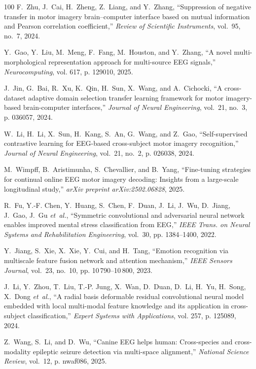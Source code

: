 \documentclass[journal]{IEEEtran}
\begin{document}
\begin{thebibliography}{100}
F.~Zhu, J.~Cai, H.~Zheng, Z.~Liang, and Y.~Zhang, ``Suppression of negative
  transfer in motor imagery brain--computer interface based on mutual
  information and {Pearson} correlation coefficient,'' \emph{Review of
  Scientific Instruments}, vol.~95, no.~7, 2024.

Y.~Gao, Y.~Liu, M.~Meng, F.~Fang, M.~Houston, and Y.~Zhang, ``A novel
  multi-morphological representation approach for multi-source {EEG} signals,''
  \emph{Neurocomputing}, vol. 617, p. 129010, 2025.

J.~Jin, G.~Bai, R.~Xu, K.~Qin, H.~Sun, X.~Wang, and A.~Cichocki, ``A
  cross-dataset adaptive domain selection transfer learning framework for motor
  imagery-based brain-computer interfaces,'' \emph{Journal of Neural
  Engineering}, vol.~21, no.~3, p. 036057, 2024.

W.~Li, H.~Li, X.~Sun, H.~Kang, S.~An, G.~Wang, and Z.~Gao, ``Self-supervised
  contrastive learning for {EEG}-based cross-subject motor imagery
  recognition,'' \emph{Journal of Neural Engineering}, vol.~21, no.~2, p.
  026038, 2024.

M.~Wimpff, B.~Aristimunha, S.~Chevallier, and B.~Yang, ``Fine-tuning strategies
  for continual online {EEG} motor imagery decoding: Insights from a
  large-scale longitudinal study,'' \emph{arXiv preprint arXiv:2502.06828},
  2025.

R.~Fu, Y.-F. Chen, Y.~Huang, S.~Chen, F.~Duan, J.~Li, J.~Wu, D.~Jiang, J.~Gao,
  J.~Gu \emph{et~al.}, ``Symmetric convolutional and adversarial neural network
  enables improved mental stress classification from {EEG},'' \emph{IEEE Trans.
  on Neural Systems and Rehabilitation Engineering}, vol.~30, pp. 1384--1400,
  2022.

Y.~Jiang, S.~Xie, X.~Xie, Y.~Cui, and H.~Tang, ``Emotion recognition via
  multiscale feature fusion network and attention mechanism,'' \emph{IEEE
  Sensors Journal}, vol.~23, no.~10, pp. 10\,790--10\,800, 2023.

J.~Li, Y.~Zhou, T.~Liu, T.-P. Jung, X.~Wan, D.~Duan, D.~Li, H.~Yu, H.~Song,
  X.~Dong \emph{et~al.}, ``A radial basis deformable residual convolutional
  neural model embedded with local multi-modal feature knowledge and its
  application in cross-subject classification,'' \emph{Expert Systems with
  Applications}, vol. 257, p. 125089, 2024.

Z.~Wang, S.~Li, and D.~Wu, ``Canine {EEG} helps human: Cross-species and
  cross-modality epileptic seizure detection via multi-space alignment,''
  \emph{National Science Review}, vol.~12, p. nwaf086, 2025.


\end{thebibliography}
\end{document}
